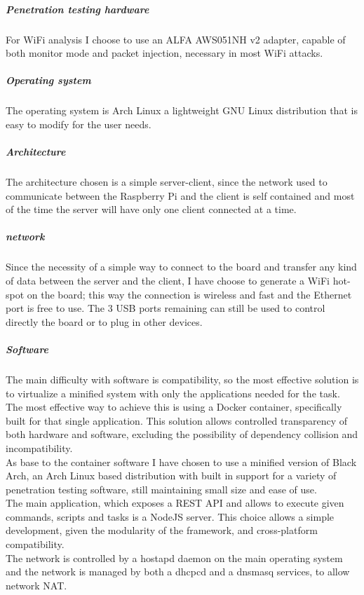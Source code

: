 \documentclass[../PiTest.tex]{subfiles}
\begin{document}
        \subparagraph{Penetration testing hardware}
            For WiFi analysis I choose to use an ALFA AWS051NH v2 adapter, capable of both monitor mode and packet injection, necessary in most WiFi attacks.

        \subparagraph{Operating system}
            The operating system is Arch Linux a lightweight GNU Linux distribution that is easy to modify for the user needs.

        \subparagraph{Architecture}
            The architecture chosen is a simple server-client, since the network used to communicate between the Raspberry Pi and the client is self contained and most of the time the server will have only one client connected at a time.

        \subparagraph{network}
            Since the necessity of a simple way to connect to the board and transfer any kind of data between the server and the client, I have choose to generate a WiFi hot-spot on the board; this way the connection is wireless and fast and the Ethernet port is free to use. The 3 USB ports remaining can still be used to control directly the board or to plug in other devices.

        \subparagraph{Software}
            The main difficulty with software is compatibility, so the most effective solution is to virtualize a minified system with only the applications needed for the task. The most effective way to achieve this is using a Docker container, specifically built for that single application. This solution allows controlled transparency of both hardware and software, excluding the possibility of dependency collision and incompatibility.\\
            As base to the container software I have chosen to use a minified version of Black Arch, an Arch Linux based distribution with built in support for a variety of penetration testing software, still maintaining small size and ease of use. \\
            The main application, which exposes a REST API and allows to execute given commands, scripts and tasks is a NodeJS server. This choice allows a simple development, given the modularity of the framework, and cross-platform compatibility.\\
            The network is controlled by a hostapd daemon on the main operating system and the network is managed by both a dhcpcd and a dnsmasq services, to allow network NAT.


			
\end{document}

